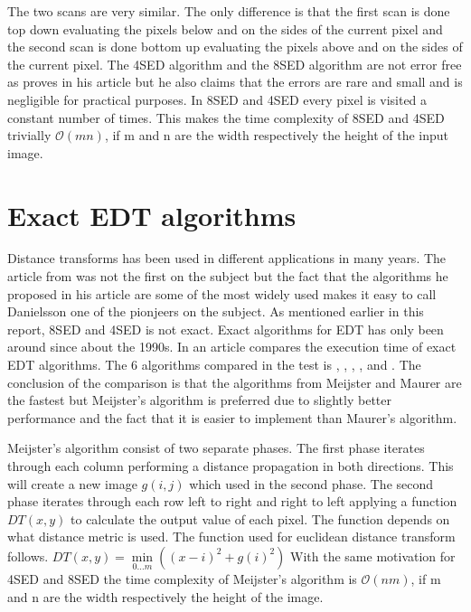 The two scans are very similar. The only difference is that the first scan is done top down evaluating the pixels below and on the sides of the current pixel and the second scan is done bottom up evaluating the pixels above and on the sides of the current pixel\citep{Ragnemalm:1993}. The 4SED algorithm and the 8SED algorithm are not error free as \citet{Danielsson} proves in his article but he also claims that the errors are rare and small and is negligible for practical purposes. In 8SED and 4SED every pixel is visited a constant number of times. This makes the time complexity of 8SED and 4SED trivially $\mathcal{O}(mn)$, if m and n are the width respectively the height of the input image.
\section{Exact EDT algorithms}\label{exactEDT}
Distance transforms has been used in different applications in many years. The article from \citet{Danielsson} was not the first on the subject but the fact that the algorithms he proposed in his article are some of the most widely used\citep{edtcompare} makes it easy to call Danielsson one of the pionjeers on the subject. As mentioned earlier in this report, 8SED and 4SED is not exact. Exact algorithms for EDT has only been around since about the 1990s. In an article \citet{edtcompare} compares the execution time of exact EDT algorithms. The 6 algorithms compared in the test is \citet{meijster}, \citet{maurer}, \citet{eggers}, \citet{lotufo}, \citet{cuisenaire} and \citet{saito}. The conclusion of the comparison is that the algorithms from Meijster and Maurer are the fastest but Meijster's algorithm is preferred due to slightly better performance and the fact that it is easier to implement than Maurer's algorithm.

Meijster's algorithm consist of two separate phases. The first phase iterates through each column performing a distance propagation in both directions. This will create a new image \begin{math}g(i, j)\end{math} which used in the second phase. The second phase iterates through each row left to right and right to left applying a function \begin{math}DT(x, y)\end{math} to calculate the output value of each pixel. The function depends on what distance metric is used. The function used for euclidean distance transform follows.\vspace{\baselineskip}\newline
\begin{math}
	DT(x, y) = \min\limits_{0\dots m}((x-i)^2+g(i)^2)
\end{math}\vspace{\baselineskip}\newline
With the same motivation for 4SED and 8SED the time complexity of Meijster's algorithm is $\mathcal{O}(nm)$, if m and n are the width respectively the height of the image.

